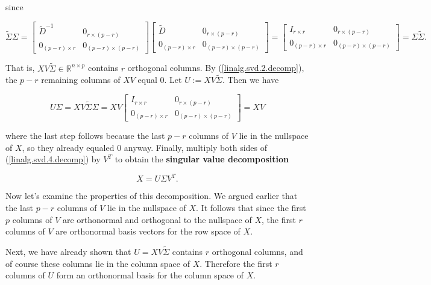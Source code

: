 since

\[
\tilde{\Sigma} \Sigma =  \begin{bmatrix} 
\tilde{D}^{-1} & 0_{r \times (p - r)} \\
0_{(p-r) \times r}  & 0_{(p-r) \times (p-r)}
\end{bmatrix} \begin{bmatrix} 
\tilde{D} & 0_{r \times (p - r)} \\
0_{(p-r) \times r}  & 0_{(p-r) \times (p-r)}
\end{bmatrix} = 
 \begin{bmatrix} 
I_{r \times r} & 0_{r \times (p - r)} \\
0_{(p-r) \times r}  & 0_{(p-r) \times (p-r)}
\end{bmatrix} =  \Sigma \tilde{\Sigma} .
\]

That is, \(XV \tilde{\Sigma} \in \mathbb{R}^{n \times p}\) contains \(r\) orthogonal columns. By (\ref{linalg.svd.2.decomp}), the \(p - r\) remaining columns of \(XV\) equal 0. Let \(U := XV \tilde{\Sigma}\). Then we have

\begin{equation}\label{linalg.svd.4.decomp}
U \Sigma = XV \tilde{\Sigma} \Sigma = XV  \begin{bmatrix} 
I_{r \times r} & 0_{r \times (p - r)} \\
0_{(p-r) \times r}  & 0_{(p-r) \times (p-r)}
\end{bmatrix} = XV
\end{equation}

where the last step follows because the last \(p -r\) columns of \(V\) lie in the nullspace of \(X\), so they already equaled 0 anyway. Finally, multiply both sides of (\ref{linalg.svd.4.decomp}) by \(V^T\) to obtain the \textbf{singular value decomposition}

\[
X = U \Sigma V^T.
\]


Now let's examine the properties of this decomposition. We argued earlier that the last \(p - r\) columns of \(V\) lie in the nullspace of \(X\). It follows that since the first \(p\) columns of \(V\) are orthonormal and orthogonal to the nullspace of \(X\), the first \(r\) columns of \(V\) are orthonormal basis vectors for the row space of \(X\). 

Next, we have already shown that \(U = XV \tilde{\Sigma}\) contains \(r\) orthogonal columns, and of course these columns lie in the column space of \(X\). Therefore the first \(r\) columns of \(U\) form an orthonormal basis for the column space of \(X\).

